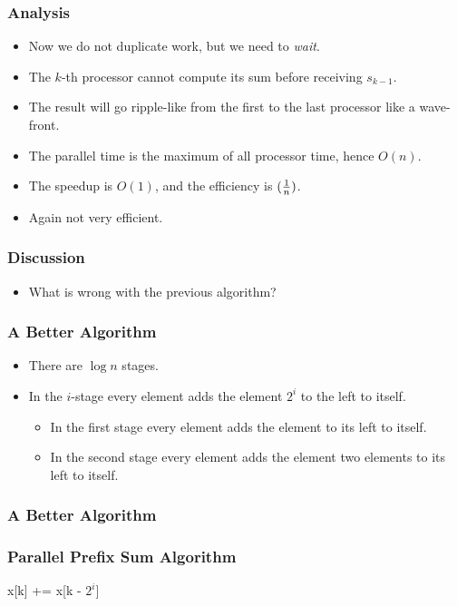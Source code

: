 \documentclass{beamer}
\begin{document}
\begin{CJK}{UTF8}{bsmi}
\begin{frame}
\frametitle{Analysis}
\begin{itemize}
\item Now we do not duplicate work, but we need to {\em wait}.
\item The $k$-th processor cannot compute its sum before receiving
 $s_{k-1}$.
\item The result will go ripple-like from the first to the last
  processor like a wave-front.
\item The parallel time is the maximum of all processor time, hence
  $O(n)$.
\item The speedup is $O(1)$, and the efficiency is $({1 \over n})$. 
\item Again not very efficient.
\end{itemize}
\end{frame}

\begin{frame}
\frametitle{Discussion}
\begin{itemize}
\item What is wrong with the previous algorithm?
\end{itemize}
\end{frame}

\begin{frame}
\frametitle{A Better Algorithm}
\begin{itemize}
\item There are $\log n$ stages.
\item In the $i$-stage every element adds the element $2^i$ to the
  left to itself.
\begin{itemize}
  \item In the first stage every element adds the element to its
    left to itself.
  \item In the second stage every element adds the element two
    elements to its left to itself.
\end{itemize}
\end{itemize}
\end{frame}

\begin{frame}
\frametitle{A Better Algorithm}
  \frametitle{Parallel Prefix Sum Algorithm}
  \begin{algorithmic}
    \STATE x[k] += x[k - $2^i$] 
    \ENDFOR 
    \ENDFOR
  \end{algorithmic}
\end{frame}


\end{CJK}
\end{document}

